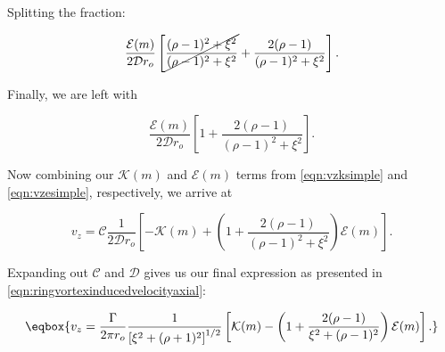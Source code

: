 \noindent Splitting the fraction:

\begin{equation}
    \frac{\mathcal{E}(m)}{2\mathcal{D}r_o} \left[ \cancel{\frac{(\rho- 1)^2 + \xi^2 }{(\rho-1)^2+\xi^2}} + \frac{2(\rho - 1)}{(\rho-1)^2+\xi^2} \right].
\end{equation}

\noindent Finally, we are left with

\begin{equation}
    \label{eqn:vzesimple}
    \frac{\mathcal{E}(m)}{2\mathcal{D}r_o} \left[ 1 + \frac{2(\rho - 1)}{(\rho-1)^2+\xi^2} \right].
\end{equation}

Now combining our \(\mathcal{K}(m)\) and \(\mathcal{E}(m)\) terms from \cref{eqn:vzksimple} and \cref{eqn:vzesimple}, respectively, we arrive at

\begin{equation}
    v_z = \mathcal{C}\frac{1}{2\mathcal{D}r_o}\left[-\mathcal{K}(m) +\left(1 + \frac{2(\rho - 1)}{(\rho-1)^2+\xi^2}\right)\mathcal{E}(m)\right].
\end{equation}

\noindent Expanding out \(\mathcal{C}\) and \(\mathcal{D}\) gives us our final expression as presented in \cref{eqn:ringvortexinducedvelocityaxial}:

\begin{equation}
    \eqbox{
        v_z = \frac{\Gamma}{2\pi r_o}\frac{1}{\left[\xi^2+(\rho+1)^2\right]^{1/2}}\left[\mathcal{K}(m) -\left(1 + \frac{2(\rho - 1)}{\xi^2 + (\rho-1)^2}\right)\mathcal{E}(m)\right].
}
\end{equation}
